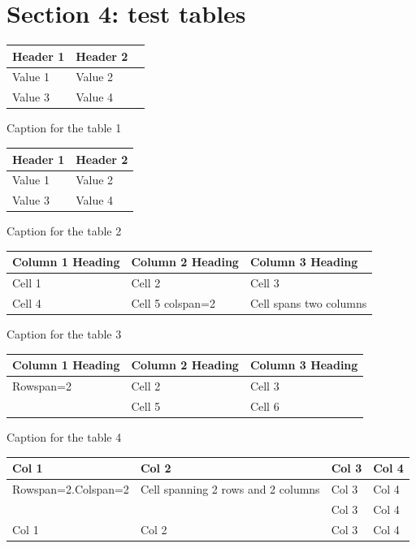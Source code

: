 \documentclass[11pt,a4paper]{article}
\begin{document}
\section{Section 4: test tables}

\begin{table}[h]
\begin{tabular}{|l|l|l|}
\hline
Header 1 & Header 2 &  \\ \hline
Value 1 & Value 2 &  \\ \hline
Value 3 & Value 4 &  \\ \hline
\end{tabular}
\end{table}

Caption for the table 1

\begin{table}[h]
\begin{tabular}{|l|l|}
\hline
Header 1 & Header 2 \\ \hline
Value 1 & Value 2 \\ \hline
Value 3 & Value 4 \\ \hline
\end{tabular}
\end{table}

Caption for the table 2

\begin{table}[h]
\begin{tabular}{|l|l|l|}
\hline
Column 1 Heading & Column 2 Heading & Column 3 Heading \\ \hline
Cell 1 & Cell 2 & Cell 3 \\ \hline
Cell 4 & Cell 5 colspan=2 & Cell spans two columns \\ \hline
\end{tabular}
\end{table}

Caption for the table 3

\begin{table}[h]
\begin{tabular}{|l|l|l|}
\hline
Column 1 Heading & Column 2 Heading & Column 3 Heading \\ \hline
Rowspan=2 & Cell 2 & Cell 3 \\ \hline
 & Cell 5 & Cell 6 \\ \hline
\end{tabular}
\end{table}

Caption for the table 4

\begin{table}[h]
\begin{tabular}{|l|l|l|l|}
\hline
Col 1 & Col 2 & Col 3 & Col 4 \\ \hline
Rowspan=2.Colspan=2 & Cell spanning 2 rows and 2 columns & Col 3 & Col 4 \\ \hline
 &  & Col 3 & Col 4 \\ \hline
Col 1 & Col 2 & Col 3 & Col 4 \\ \hline
\end{tabular}
\end{table}
\end{document}
